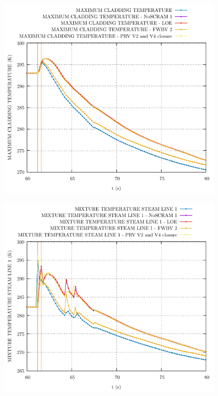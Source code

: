 \documentclass{article}
\begin{document}
\begin{multicols}{2}
\begin{figure}[H]
\centering
\includegraphics[width=\linewidth]{./graphs/MAXIMUM CLADDING TEMPERATURE.pdf}
\end{figure}
\begin{figure}[H]
\centering
\includegraphics[width=\linewidth]{./graphs/MIXTURE TEMPERATURE STEAM LINE 1.pdf}
\end{figure}

\end{multicols}
\end{document}
